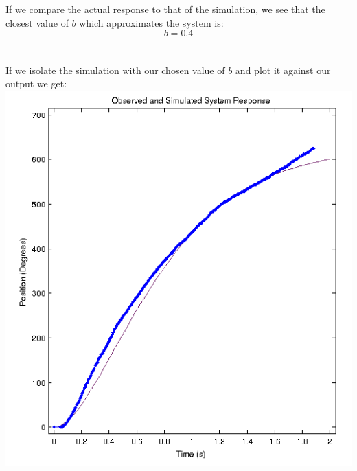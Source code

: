 \documentclass{article}
\begin{document}
\\
\\
If we compare the actual response to that of the simulation, we see that the closest value of $b$ which approximates the system is:
\\
\[ b = 0.4 \]
\\
\pagebreak
\\
If we isolate the simulation with our chosen value of $b$ and plot it against our output we get:
\\
\includegraphics[width=14cm]{ChosenSimComparitive.png}
\end{document}
